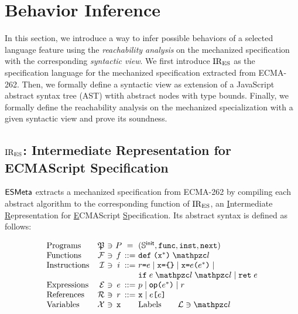 \section{Behavior Inference}\label{sec:infer}

In this section, we introduce a way to infer possible behaviors of a selected
language feature using the \textit{reachability analysis} on the mechanized
specification with the corresponding \textit{syntactic view}.  We first
introduce $\text{IR}_\text{ES}$ as the specification language for the mechanized specification
extracted from ECMA-262.  Then, we formally define a syntactic view as extension
of a JavaScript abstract syntax tree (AST) wtith abstract nodes with type
bounds.  Finally, we formally define the reachability analysis on the mechanized
specialization with a given syntactic view and prove its soundness.

\subsection{$\text{IR}_\text{ES}$: Intermediate Representation for ECMAScript Specification}

$\esmeta$ extracts a mechanized specification from ECMA-262 by compiling each
abstract algorithm to the corresponding function of $\text{IR}_\text{ES}$, an
\underline{I}ntermediate \underline{R}epresentation for \underline{E}CMAScript
\underline{S}pecification.  Its abstract syntax is defined as follows:

\[
  \begin{array}{lr@{~}c@{~}c@{~}c@{~}l}
    \text{Programs} & \progset &\ni& \prog &=& (\initstset,
    \getfunc, \getinst, \getnext)\\

    \text{Functions} & \funcset &\ni& \func &::=&
    \kwdef \; \kwrl \varx^* \kwrr \; \lab\\

    \text{Instructions} & \instset &\ni& \inst &::=&
    \refer \kweq \expr \mid
    \varx \kweq \kwcl \kwcr \mid
    \varx \kweq \expr \kwrl \expr^* \kwrr \mid \\&&&&&
    \kwif \; \expr \; \lab \; \lab \mid
    \kwret \; \expr\\

    \text{Expressions} & \exprset &\ni& \expr &::=&
    \pval \mid
    \op \kwrl \expr^* \kwrr \mid
    \refer\\

    \text{References} & \referset &\ni& \refer &::=&
    \varx \mid \expr \kwsl \expr \kwsr\\

    \text{Variables} & \varset &\ni& \varx &&

    \text{Labels} \qquad \labset \ni \lab\\
  \end{array}
\]

